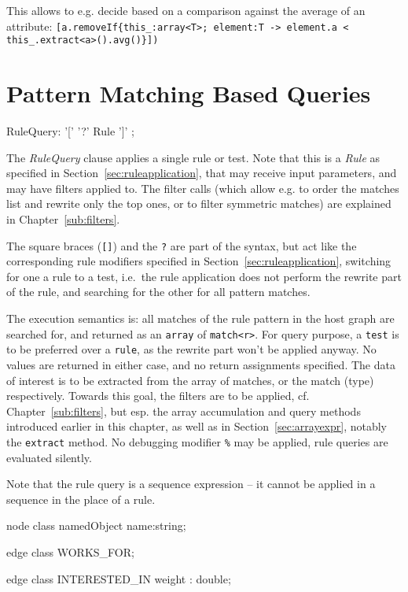 This allows to e.g. decide based on a comparison against the average of an attribute: \verb#[a.removeIf{this_:array<T>; element:T -> element.a < this_.extract<a>().avg()}])#

\section{Pattern Matching Based Queries}\label{sec:patternbasedgraphquery}

\begin{rail}
  RuleQuery: '[' '?' Rule ']' ;
\end{rail}

The \emph{RuleQuery} clause applies a single rule or test.
Note that this is a \emph{Rule} as specified in Section~\ref{sec:ruleapplication}, that may receive input parameters, and may have filters applied to.
The filter calls (which allow e.g. to order the matches list and rewrite only the top ones, or to filter symmetric matches) are explained in Chapter~\ref{sub:filters}.

The square braces (\texttt{[]}) and the \texttt{?} are part of the syntax, but act like the corresponding rule modifiers specified in Section~\ref{sec:ruleapplication}, switching for one a rule to a test, i.e.\ the rule application does not perform the rewrite part of the rule, and searching for the other for all pattern matches.

The execution semantics is: all matches of the rule pattern in the host graph are searched for, and returned as an \texttt{array} of \texttt{match<r>}.
For query purpose, a \texttt{test} is to be preferred over a \texttt{rule}, as the rewrite part won't be applied anyway. 
No values are returned in either case, and no return assignments specified.
The data of interest is to be extracted from the array of matches, or the match (type) respectively.
Towards this goal, the filters are to be applied, cf. Chapter~\ref{sub:filters}, but esp. the array accumulation and query methods introduced earlier in this chapter, as well as in Section~\ref{sec:arrayexpr}, notably the \texttt{extract} method.
No debugging modifier \texttt{\%} may be applied, rule queries are evaluated silently.

Note that the rule query is a sequence expression -- it cannot be applied in a sequence in the place of a rule.

\begin{example}
  \begin{grgen}
node class namedObject
{
	name:string;
}

edge class WORKS_FOR;

edge class INTERESTED_IN
{
	weight : double;
}
  \end{grgen}
\end{example}


